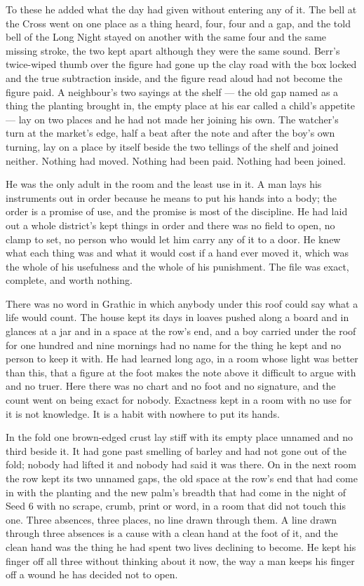 To these he added what the day had given without entering any of it. The bell at the Cross went on one place as a thing heard, four, four and a gap, and the told bell of the Long Night stayed on another with the same four and the same missing stroke, the two kept apart although they were the same sound. Berr's twice-wiped thumb over the figure had gone up the clay road with the box locked and the true subtraction inside, and the figure read aloud had not become the figure paid. A neighbour's two sayings at the shelf --- the old gap named as a thing the planting brought in, the empty place at his ear called a child's appetite --- lay on two places and he had not made her joining his own. The watcher's turn at the market's edge, half a beat after the note and after the boy's own turning, lay on a place by itself beside the two tellings of the shelf and joined neither. Nothing had moved. Nothing had been paid. Nothing had been joined.

He was the only adult in the room and the least use in it. A man lays his instruments out in order because he means to put his hands into a body; the order is a promise of use, and the promise is most of the discipline. He had laid out a whole district's kept things in order and there was no field to open, no clamp to set, no person who would let him carry any of it to a door. He knew what each thing was and what it would cost if a hand ever moved it, which was the whole of his usefulness and the whole of his punishment. The file was exact, complete, and worth nothing.

There was no word in Grathic in which anybody under this roof could say what a life would count. The house kept its days in loaves pushed along a board and in glances at a jar and in a space at the row's end, and a boy carried under the roof for one hundred and nine mornings had no name for the thing he kept and no person to keep it with. He had learned long ago, in a room whose light was better than this, that a figure at the foot makes the note above it difficult to argue with and no truer. Here there was no chart and no foot and no signature, and the count went on being exact for nobody. Exactness kept in a room with no use for it is not knowledge. It is a habit with nowhere to put its hands.

In the fold one brown-edged crust lay stiff with its empty place unnamed and no third beside it. It had gone past smelling of barley and had not gone out of the fold; nobody had lifted it and nobody had said it was there. On  in the next room the row kept its two unnamed gaps, the old space at the row's end that had come in with the planting and the new palm's breadth that had come in the night of Seed 6 with no scrape, crumb, print or word, in a room that did not touch this one. Three absences, three places, no line drawn through them. A line drawn through three absences is a cause with a clean hand at the foot of it, and the clean hand was the thing he had spent two lives declining to become. He kept his finger off all three without thinking about it now, the way a man keeps his finger off a wound he has decided not to open.

